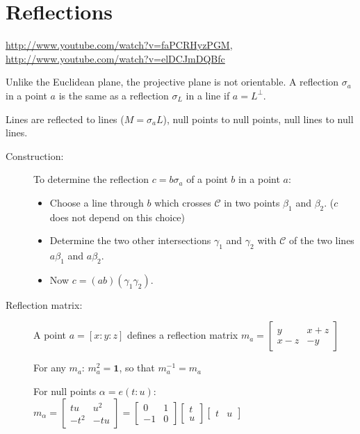 \documentclass[DIV16,halfparskip]{scrartcl}
\newcommand{\nullcm}{\mathcal C}
\newcommand{\nullconic}{$\nullcm$ }
\newcommand{\C}{\!\!:\!\!}
\begin{document}
\section{Reflections}
\url{http://www.youtube.com/watch?v=faPCRHyzPGM},
\url{http://www.youtube.com/watch?v=elDCJmDQBfc}

Unlike the Euclidean plane, the projective plane is not orientable. A
reflection $\sigma_a$ in a point $a$ is the same as a reflection $\sigma_L$ in
a line if $a=L^\perp$.

Lines are reflected to lines ($M=\sigma_aL$), null points to null points, null
lines to null lines.

\begin{description}
    \item[Construction:]
    To determine the reflection $c=b\sigma_a$ of a point $b$ in a point $a$:

    \begin{itemize}
        \item Choose a line through $b$ which crosses \nullconic in two points
            $\beta_1$ and $\beta_2$. ($c$ does not depend on this choice)
        \item Determine the two other intersections $\gamma_1$ and $\gamma_2$ with
            \nullconic of the two lines $a\beta_1$ and $a\beta_2$.
        \item Now $c=(ab)(\gamma_1\gamma_2)$.
    \end{itemize}

    \item[Reflection matrix:] A point $a=[x\C y\C z]$ defines a reflection
        matrix
    \( m_a = \left[\begin{array}{cc}y & x+z\\ x-z & -y\end{array}\right] \)

        For any $m_a$: $m_a^2 = \mathbf{1}$, so that $m_a^{-1} = m_a$

        For null points $\alpha=e(t:u)$:
       \( m_\alpha = \left[\begin{array}{cc}tu & u^2 \\ -t^2 & -tu\end{array}\right] 
        = \left[\begin{array}{cc}0 & 1 \\ -1 & 0\end{array}\right]
          \left[\begin{array}{c}t \\ u\end{array}\right] \left[\begin{array}{cc}t & u\end{array}\right]
        \)


\end{description}
\end{document}
